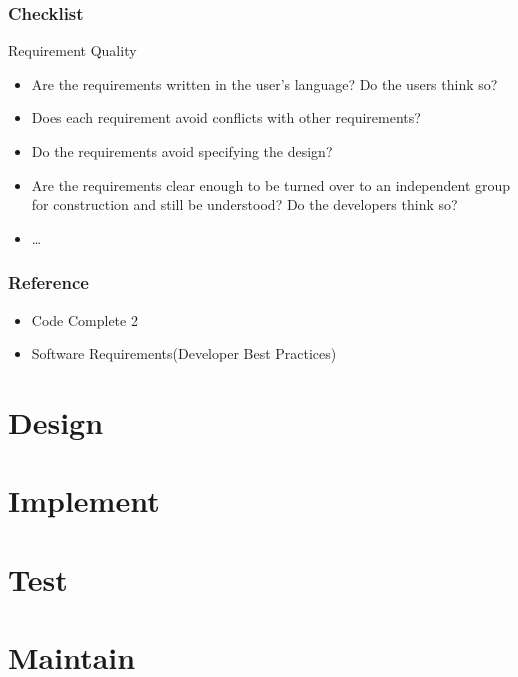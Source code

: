 \documentclass[UTF8]{beamer}
\begin{document}
\begin{frame}
    \frametitle{Checklist}
    \begin{block}{Requirement Quality}
        \begin{itemize}
            \item Are the requirements written in the user’s language? Do the users think so?
            \item Does each requirement avoid conflicts with other requirements?
            \item Do the requirements avoid specifying the design?
            \item Are the requirements clear enough to be turned over to an independent group for construction and still be understood? Do the developers think so?
            \item \ldots
        \end{itemize}
    \end{block}
\end{frame}

\begin{frame}
    \frametitle{Reference}
    \begin{itemize}
        \item Code Complete 2
        \item Software Requirements(Developer Best Practices)
    \end{itemize}
\end{frame}

\section{Design}
\section{Implement}
\section{Test}
\section{Maintain}
\end{document}
